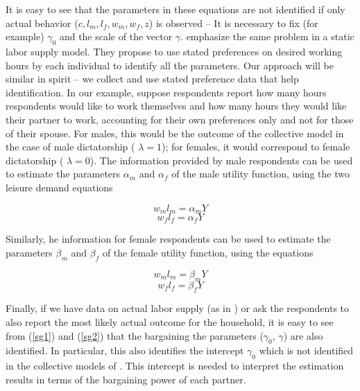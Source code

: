 \documentclass[11pt,letter]{article}
\begin{document}
\par It is easy to see that the parameters in these equations are not identified if only actual behavior ($c,l_{m},l_{f},w_{m}, w_{f}, z$) is observed -- It is necessary to fix (for example) $\gamma_0$ and the scale of the vector $\gamma$. \citet{kapteyn1992} emphasize the same problem in a static labor supply model. They propose to use stated preferences on desired working hours by each individual to identify all the parameters. Our approach will be similar in spirit -- we collect and use stated preference data that help identification. In our example, suppose respondents report how many hours respondents would like to work themselves and how many hours they would like their partner to work, accounting for their own preferences only and not for those of their spouse. For males, this would be the outcome of the collective model in the case of male dictatorship ( $\lambda=1$); for females, it would correspond to female dictatorship ( $\lambda=0$). The information provided by male respondents can be used to estimate the parameters $\alpha_m$ and $\alpha_f$ of the male utility function, using the two leisure demand equations

\begin{equation}  \label{male_dictator}
w_{m}l_{m}= \alpha_m Y
\end{equation}
\begin{equation}
w_{f}l_{f}=  \alpha_f Y
\end{equation}

Similarly, he information for female respondents can be used to estimate the parameters $\beta_m$ and $\beta_f$ of the female utility function, using the equations

\begin{equation}  \label{female_dictator}
w_{m}l_{m}= \beta_m Y
\end{equation}
\begin{equation}
w_{f}l_{f}=  \beta_f Y
\end{equation}

Finally, if we have data on actual labor supply (as in \citet{Kooreman1990}) or ask the respondents to also report the most likely actual outcome for the household, it is easy to see from (\ref{sg1}) and (\ref{sg2}) that the bargaining the parameters ($\gamma_{0}$, $\gamma$) are also identified. In particular, this also identifies the intercept $\gamma_0$ which is not identified in the collective models of \cite{chiappori1988,chiappori1992,chiappori2002}. This intercept is needed to interpret the estimation results in terms of the bargaining power of each partner.
\end{document}
